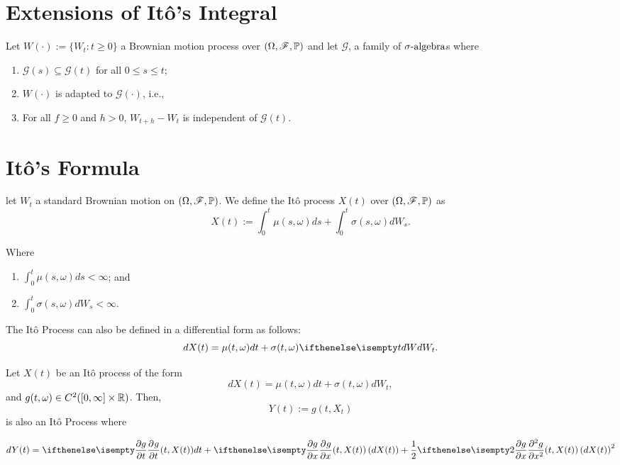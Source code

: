 \documentclass[../TGMAFFIRO.tex]{subfiles}
\begin{document}
\section{Extensions of It\^o's Integral}
\begin{definition}
	Let $W(\cdot) := \{W_t : t\geq 0\}$ a Brownian motion process over $(\Omega, \mathscr{F}, \mathbb{P})$ and let $\mathscr{G}$, a family of $\sigma\text{-algebra}$s where
	\begin{enumerate}
		\item $\mathscr{G}(s) \subseteq \mathscr{G}(t)$ for all $0\leq s \leq t$;
		\item $W(\cdot)$ is adapted to $\mathscr{G}(\cdot)$, i.e.,
		\item For all $f\geq 0$ and $h > 0$, $W_{t+h} - W_t$ is independent of $\mathscr{G}(t)$.
	\end{enumerate}
\end{definition}

\section{It\^o's Formula}\label{th:itos_formula}
\begin{definition}
	let $W_t$ a standard Brownian motion on $(\Omega, \mathscr{F}, \mathbb{P})$. We define the It\^o process $X(t)$ over $(\Omega, \mathscr{F}, \mathbb{P})$ as
	\begin{equation}
		X(t) := \int_0^t\mu(s,\omega) ds  + \int_0^t\sigma(s,\omega) dW_s.
	\end{equation}
	
	Where
	\begin{enumerate}
		\item $\int_0^t \mu(s,\omega) ds < \infty$; and
		\item $\int_0^t\sigma(s,\omega) dW_s < \infty$.
	\end{enumerate}
	
	The It\^o Process can also be defined in a differential form as follows:
	\begin{equation}
		dX(t) = \mu(t, \omega) dt + \sigma(t, \omega) \dW[t].
	\end{equation}
\end{definition}

\begin{theorem}
	Let $X(t)$ be an It\^o process of the form
	\[
		dX(t) = \mu(t, \omega) dt + \sigma(t, \omega) dW_t,
	\]
	and $g(t, \omega) \in C^2([0, \infty]\times\mathbb{R})$. Then,
	\begin{equation}
		Y(t) := g(t, X_t)
	\end{equation}
	is also an It\^o Process where
	
	\begin{equation}\label{eq:itos_formula}
		dY(t) = \partialwrt{g}{t}(t, X(t)) dt + \partialwrt{g}{x}(t, X(t)) \left(dX(t)\right) + \frac{1}{2}\partialwrt[2]{g}{x} (t, X(t)) \left(dX(t)\right)^2
	\end{equation}	
\end{theorem}
\end{document}
